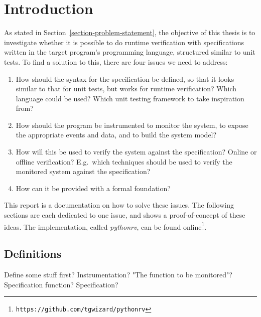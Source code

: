 \documentclass[a4paper,11pt]{kth-mag}
\begin{document}
\section{Introduction}

As stated in Section~\ref{section-problem-statement}, the objective of this
thesis is to investigate whether it is possible to do runtime verification with
specifications written in the target program's programming language, structured
similar to unit tests. To find a solution to this, there are four issues we
need to address:

\begin{enumerate}
	\item How should the syntax for the specification be defined, so that it
		looks similar to that for unit tests, but works for runtime verification?
		Which language could be used? Which unit testing framework to take
		inspiration from?
	\item How should the program be instrumented to monitor the system, to expose
		the appropriate events and data, and to build the system model?
	\item How will this be used to verify the system against the
		specification? Online or offline verification? E.g.\ which techniques
		should be used to verify the monitored system against the specification?
	\item How can it be provided with a formal foundation?
\end{enumerate}

This report is a documentation on how to solve these issues. The following
sections are each dedicated to one issue, and shows a proof-of-concept of these
ideas. The implementation, called \textit{pythonrv}, can be found
online\footnote{\texttt{https://github.com/tgwizard/pythonrv}}.

\subsection{Definitions}

Define some stuff first? Instrumentation? "The function to be monitored"?
Specification function? Specification?
\end{document}
